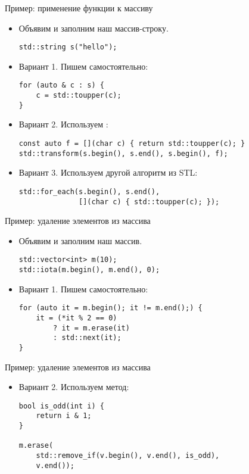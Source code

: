 \documentclass{beamer}
\begin{document}
\begin{frame}[fragile]{Пример: применение функции к массиву}
    \begin{itemize}
        \item Объявим и заполним наш массив-строку.
            \begin{lstlisting}
std::string s("hello");
            \end{lstlisting}
        \item Вариант 1. Пишем самостоятельно:
            \begin{lstlisting}
for (auto & c : s) {
    c = std::toupper(c);
}
            \end{lstlisting}
        \item Вариант 2. Используем :
            \begin{lstlisting}
const auto f = [](char c) { return std::toupper(c); }
std::transform(s.begin(), s.end(), s.begin(), f);
            \end{lstlisting}
        \item Вариант 3. Используем другой алгоритм из STL:
            \begin{lstlisting}
std::for_each(s.begin(), s.end(),
              [](char c) { std::toupper(c); });
            \end{lstlisting}
    \end{itemize}
\end{frame}

\begin{frame}[fragile]{Пример: удаление элементов из массива}
    \begin{itemize}
        \item Объявим и заполним наш массив.
            \begin{lstlisting}
std::vector<int> m(10);
std::iota(m.begin(), m.end(), 0);
            \end{lstlisting}
        \item Вариант 1. Пишем самостоятельно:
            \begin{lstlisting}
for (auto it = m.begin(); it != m.end();) {
    it = (*it % 2 == 0)
        ? it = m.erase(it)
        : std::next(it);
}
            \end{lstlisting}
    \end{itemize}
\end{frame}

\begin{frame}[fragile]{Пример: удаление элементов из массива}
    \begin{itemize}
        \item Вариант 2. Используем метод:
            \begin{lstlisting}
bool is_odd(int i) {
    return i & 1;
}

m.erase(
    std::remove_if(v.begin(), v.end(), is_odd),
    v.end());
            \end{lstlisting}
    \end{itemize}
\end{frame}
\end{document}
